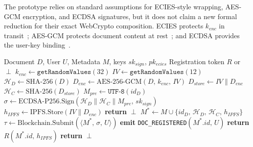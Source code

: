 \documentclass{ieeeaccess}
\begin{document}
The prototype relies on standard assumptions for ECIES-style wrapping, AES-GCM encryption, and ECDSA signatures, but it does not claim a new formal reduction for their exact WebCrypto composition. ECIES protects $k_{enc}$ in transit~\cite{ieee1363a2004}; AES-GCM protects document content at rest~\cite{fips197}; and ECDSA provides the user-key binding~\cite{fips1865}.

\begin{algorithm}[H]
\caption{Document Registration (Sign-Then-Store Pattern)}
\label{alg:doc_registration}
\small
\begin{algorithmic}[1]
\REQUIRE Document $D$, User $U$, Metadata $M$, keys $sk_{sign}$,
         $pk_{ecies}$
\ENSURE Registration token $R$ or $\perp$
\STATE $k_{enc} \leftarrow \texttt{getRandomValues}(32)$
\STATE $\mathit{IV} \leftarrow \texttt{getRandomValues}(12)$
\STATE $\mathcal{H}_D \leftarrow \text{SHA-256}(D)$
\STATE $D_{enc} \leftarrow \text{AES-256-GCM}(D,\,k_{enc},\,\mathit{IV})$
\STATE $D_{store} \leftarrow \mathit{IV} \| D_{enc}$
\STATE $\mathcal{H}_C \leftarrow \text{SHA-256}(D_{store})$
\STATE $M_{pre} \leftarrow \texttt{UTF-8}(id_D)$
\STATE $\sigma \leftarrow \text{ECDSA-P256.Sign}(\mathcal{H}_D \| \mathcal{H}_C \|
       M_{pre},\,sk_{sign})$
\STATE $h_{IPFS} \leftarrow \text{IPFS.Store}(\mathit{IV} \| D_{enc})$
    \STATE \textbf{return} $\perp$
\ENDIF
\STATE $M^* \leftarrow M \cup \{id_D,\,\mathcal{H}_D,\,\mathcal{H}_C,\,h_{IPFS}\}$
\STATE $\tau \leftarrow \text{Blockchain.Submit}(\langle M^*,\,\sigma,\,
       U \rangle)$
    \STATE \textbf{emit} \texttt{DOC\_REGISTERED}$(M^*.id,\,U)$
    \STATE \textbf{return} $R(M^*.id,\,h_{IPFS})$
\ELSE
    \STATE \textbf{return} $\perp$
\ENDIF
\end{algorithmic}
\end{algorithm}
\end{document}
